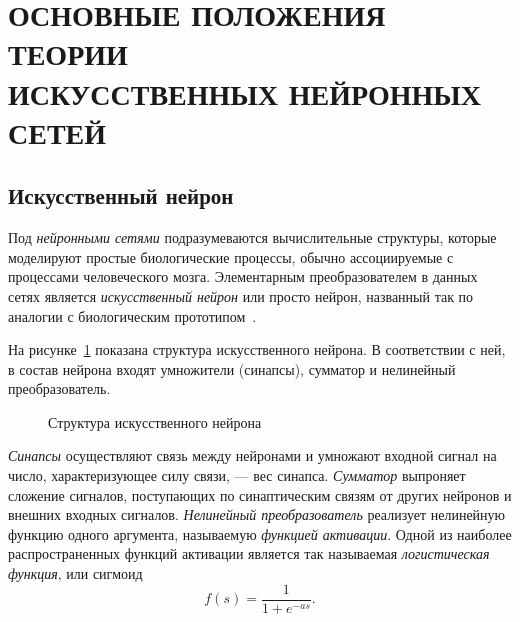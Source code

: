 \section[Основные положения теории искусственных нейронных сетей]{%
  ОСНОВНЫЕ ПОЛОЖЕНИЯ ТЕОРИИ \\
  ИСКУССТВЕННЫХ НЕЙРОННЫХ СЕТЕЙ
}

\subsection{Искусственный нейрон}

Под \emph{нейронными сетями} подразумеваются вычислительные структуры,
которые моделируют простые биологические процессы,
обычно ассоциируемые с процессами человеческого мозга.
Элементарным преобразователем в данных сетях является \emph{искусственный нейрон}
или просто нейрон, названный так по аналогии с биологическим прототипом~\cite{kruglov2001}.

На рисунке~\ref{fig:struct_neuron} показана структура искусственного нейрона.
В соответствии с ней, в состав нейрона входят умножители (синапсы),
сумматор и нелинейный преобразователь.

\begin{figure}[h!]
  \centering
  \caption{Структура искусственного нейрона}
  \label{fig:struct_neuron}
\end{figure}

\emph{Синапсы} осуществляют связь между нейронами и умножают входной сигнал на число,
характеризующее силу связи, --- вес синапса.
\emph{Сумматор} выпроняет сложение сигналов, поступающих по синаптическим связям от
других нейронов и внешних входных сигналов.
\emph{Нелинейный преобразователь} реализует нелинейную функцию одного аргумента,
называемую \emph{функцией активации}.
Одной из наиболее распространенных функций активации является
так называемая \emph{логистическая функция}, или сигмоид
\[
  f(s) = \dfrac{1}{1 + e^{-as}}.
\]

